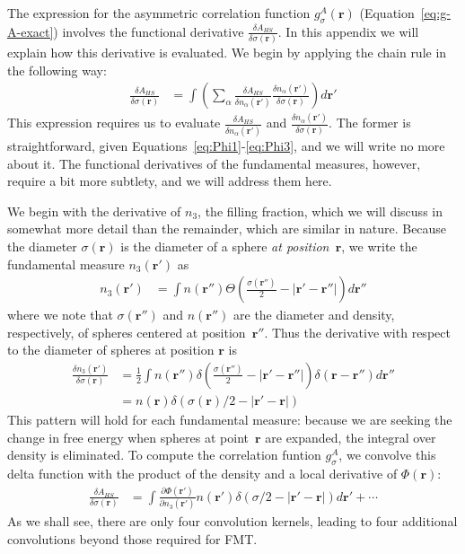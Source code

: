 \documentclass[letterpaper,amsmath,amssymb,10pt,pre]{revtex4-1}
\newcommand{\rr}{\textbf{r}}
\begin{document}
The expression for the asymmetric correlation function
$g_\sigma^A(\rr)$ (Equation~\ref{eq:g-A-exact}) involves the
functional derivative $\frac{\delta A_{HS}}{\delta
  \sigma(\mathbf{r})}$.  In this appendix we will explain how this
derivative is evaluated.  We begin by applying the chain rule in the
following way:
  \begin{align}
    \frac{\delta A_{HS}}{\delta \sigma(\mathbf{r})} &=
    \int \left(
    \sum_\alpha
    \frac{\delta A_{HS}}{\delta n_\alpha(\mathbf{r}')}
    \frac{\delta n_\alpha(\mathbf{r}')}{\delta \sigma(\mathbf{r})}
    \right) d\mathbf{r}'
  \end{align}
This expression requires us to evaluate $\frac{\delta A_{HS}}{\delta
  n_\alpha(\mathbf{r}')}$ and $\frac{\delta
  n_\alpha(\mathbf{r}')}{\delta \sigma(\mathbf{r})}$.  The former is
straightforward, given Equations~\ref{eq:Phi1}-\ref{eq:Phi3}, and we
will write no more about it.  The functional derivatives of the
fundamental measures, however, require a bit more subtlety, and we
will address them here.

We begin with the derivative of $n_3$, the filling fraction, which we
will discuss in somewhat more detail than the remainder, which are
similar in nature.  Because the diameter $\sigma(\rr)$ is the diameter
of a sphere \emph{at position~$\rr$}, we write the fundamental measure
$n_3(\rr')$ as
\begin{align}
  n_3(\rr') &= \int n(\rr'') \Theta\left(\frac{\sigma(\rr'')}{2}
  -\left|\rr' - \rr''\right|\right)
  d\rr''
\end{align}
where we note that $\sigma(\rr'')$ and $n(\rr'')$ are the diameter and
density, respectively, of spheres centered at position~$\rr''$.  Thus the
derivative with respect to the diameter of spheres at position
$\rr$ is
\begin{align}
  \frac{\delta n_3(\rr')}{\delta \sigma(\rr)} &= \frac 12 \int n
  (\rr'') \delta\left(\frac{\sigma(\rr'')}{2} -\left|\rr' - \rr''\right|\right)
  \delta(\rr-\rr'') d\rr'' \\ &= n (\rr) \delta(\sigma(\rr)/2
  -\left|\rr' - \rr\right|)
\end{align}
This pattern will hold for each fundamental measure: because we are
seeking the change in free energy when spheres at point~$\rr$ are
expanded, the integral over density is eliminated.  To compute the
correlation funtion $g_\sigma^A$, we convolve this delta function with
the product of the density and a local derivative of $\Phi(\rr)$:
\begin{align}
  \frac{\delta A_{HS}}{\delta \sigma(\rr)} &= \int \frac{\partial \Phi(\rr')}{\partial
    n_3(\rr')}n(\rr') \delta(\sigma/2-|\rr'-\rr|)d\rr'
  + \cdots
\end{align}
As we shall see, there are only four convolution kernels, leading to
four additional convolutions beyond those required for FMT.
\end{document}
